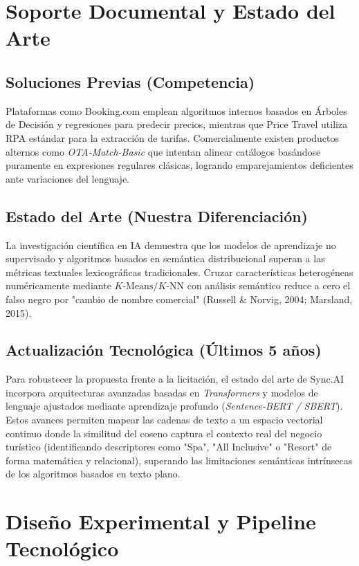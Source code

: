 \documentclass[11pt,a4paper]{article}
\begin{document}
\section{Soporte Documental y Estado del Arte}
\subsection{Soluciones Previas (Competencia)}
Plataformas como Booking.com emplean algoritmos internos basados en Árboles de Decisión y regresiones para predecir precios, mientras que Price Travel utiliza RPA estándar para la extracción de tarifas. Comercialmente existen productos alternos como \textit{OTA-Match-Basic} que intentan alinear catálogos basándose puramente en expresiones regulares clásicas, logrando emparejamientos deficientes ante variaciones del lenguaje.

\subsection{Estado del Arte (Nuestra Diferenciación)}
La investigación científica en IA demuestra que los modelos de aprendizaje no supervisado y algoritmos basados en semántica distribucional superan a las métricas textuales lexicográficas tradicionales. Cruzar características heterogéneas numéricamente mediante $K\text{-Means} / K\text{-NN} $ con análisis semántico reduce a cero el falso negro por "cambio de nombre comercial" (Russell \& Norvig, 2004; Marsland, 2015).

\subsection{Actualización Tecnológica (Últimos 5 años)}
Para robustecer la propuesta frente a la licitación, el estado del arte de Sync.AI incorpora arquitecturas avanzadas basadas en \textit{Transformers} y modelos de lenguaje ajustados mediante aprendizaje profundo (\textit{Sentence-BERT / SBERT}). Estos avances permiten mapear las cadenas de texto a un espacio vectorial continuo donde la similitud del coseno captura el contexto real del negocio turístico (identificando descriptores como "Spa", "All Inclusive" o "Resort" de forma matemática y relacional), superando las limitaciones semánticas intrínsecas de los algoritmos basados en texto plano.

\newpage

\section{Diseño Experimental y Pipeline Tecnológico}
\end{document}
